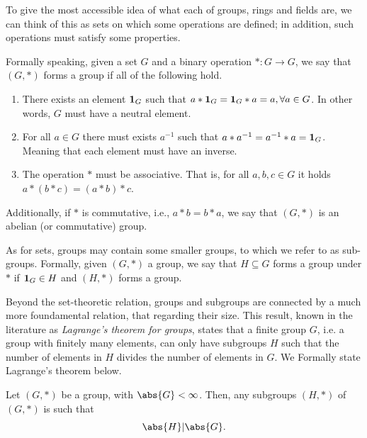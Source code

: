 \documentclass{subfiles}
\begin{document}
    To give the most accessible idea of what each of groups, rings and fields are,
        we can think of this as sets on which some operations are defined; 
        in addition, such operations must satisfy some properties.

    Formally speaking, given a set \(G\) and a binary operation \(* : G \to G\)\footnotemark,
        we say that \((G, *)\) forms a group if all of the following hold.
        \begin{enumerate}
            \item There exists an element \(\mathbf{1}_{G}\) such that \( a * \mathbf{1}_{G} = \mathbf{1}_{G} * a = a,
                \forall a \in G\). In other words, \(G\) must have a neutral element.

            \item For all \(a \in G\) there must exists \(a^{-1}\) such that 
                \(a * a^{-1} = a^{-1} * a = \mathbf{1}_{G}\). 
                Meaning that each element must have an inverse.

            \item The operation \(*\) must be associative.
                That is, for all \(a, b, c \in G\) it holds \( a * (b * c) = (a * b) * c\).
        \end{enumerate}
        Additionally, if \(*\) is commutative, i.e., \(a * b = b * a\),
        we say that \((G, *)\) is an abelian (or commutative) group.


    As for sets, groups may contain some smaller groups, to which we refer to as sub-groups.
        Formally, given \((G, *)\) a group, we say that \(H \subseteq G\) forms a group under 
        \(*\) if \(\mathbf{1}_G \in H\) and \((H, *)\) forms a group.
        
    Beyond the set-theoretic relation, groups and subgroups are connected by a much more 
        foundamental relation, that regarding their size. This result,
        known in the literature as \emph{Lagrange's theorem for groups},
        states that a finite group \(G\), i.e. a group with finitely many elements,
        can only have subgroups \(H\) such that the number of elements in \(H\) 
        divides the number of elements in \(G\).
        We Formally state Lagrange's theorem below.
        \begin{theorem*}
            Let \((G, *)\) be a group, with \(\abs{G} < \infty\). Then, 
                any subgroups \((H, *)\) of \((G, *)\) is such that
                \[
                    \abs{H} \vert \abs{G}.
                \]
        \end{theorem*}
\end{document}
